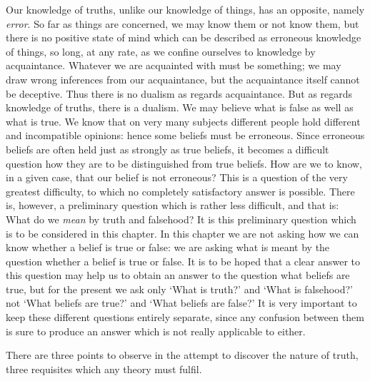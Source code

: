 \documentclass[oneside,letterpaper,12pt]{book}
\begin{document}
Our knowledge of truths, unlike our knowledge of things, has an
opposite, namely \emph{error}. So far as things are concerned, we may
know them or not know them, but there is no positive state of mind which
can be described as erroneous knowledge of things, so long, at any rate,
as we confine ourselves to knowledge by acquaintance. Whatever we are
acquainted with must be something; we may draw wrong inferences from our
acquaintance, but the acquaintance itself cannot be deceptive. Thus
there is no dualism as regards acquaintance. But as regards knowledge of
truths, there is a dualism. We may believe what is false as well as what
is true. We know that on very many subjects different people hold
different and incompatible opinions: hence some beliefs must be
erroneous. Since erroneous beliefs are often held just as strongly as
true beliefs, it becomes a difficult question how they are to be
distinguished from true beliefs. How are we to know, in a given case,
that our belief is not erroneous? This is a question of the very
greatest difficulty, to which no completely satisfactory answer is
possible. There is, however, a preliminary question which is rather less
difficult, and that is: What do we \emph{mean} by truth and falsehood?
It is this preliminary question which is to be considered in this
chapter. In this chapter we are not asking how we can know whether a
belief is true or false: we are asking what is meant by the question
whether a belief is true or false. It is to be hoped that a clear answer
to this question may help us to obtain an answer to the question what
beliefs are true, but for the present we ask only `What
is truth?' and `What is
falsehood?' not `What beliefs are
true?' and `What beliefs are
false?' It is very important to keep these different
questions entirely separate, since any confusion between them is sure to
produce an answer which is not really applicable to either.

There are three points to observe in the attempt to discover the nature
of truth, three requisites which any theory must fulfil.
\end{document}
